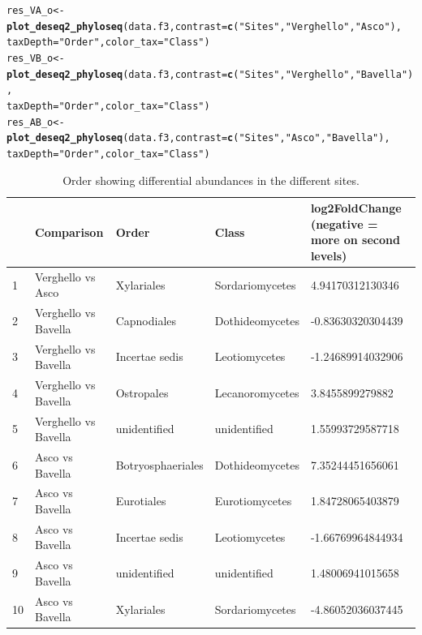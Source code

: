 \documentclass[12pt]{article}\usepackage[]{graphicx}\usepackage[]{color}
\makeatletter
\newcommand{\hlstr}[1]{\textcolor[rgb]{0.192,0.494,0.8}{#1}}%
\newcommand{\hlstd}[1]{\textcolor[rgb]{0.345,0.345,0.345}{#1}}%
\newcommand{\hlkwb}[1]{\textcolor[rgb]{0.69,0.353,0.396}{#1}}%
\newcommand{\hlkwc}[1]{\textcolor[rgb]{0.333,0.667,0.333}{#1}}%
\newcommand{\hlkwd}[1]{\textcolor[rgb]{0.737,0.353,0.396}{\textbf{#1}}}%
\newenvironment{kframe}{%
 \def\at@end@of@kframe{}%
 \ifinner\ifhmode%
  \def\at@end@of@kframe{\end{minipage}}%
  \begin{minipage}{\columnwidth}%
 \fi\fi%
 \def\FrameCommand##1{\hskip\@totalleftmargin \hskip-\fboxsep
 \colorbox{shadecolor}{##1}\hskip-\fboxsep
     \hskip-\linewidth \hskip-\@totalleftmargin \hskip\columnwidth}%
 \MakeFramed {\advance\hsize-\width
   \@totalleftmargin\z@ \linewidth\hsize
   \@setminipage}}%
 {\par\unskip\endMakeFramed%
 \at@end@of@kframe}
\newenvironment{knitrout}{}{} %
\numberwithin{figure}{section}
\makeatother
\begin{document}
\begin{knitrout}\small
{}\color{fgcolor}\begin{kframe}
\begin{alltt}
\hlstd{res_VA_o} \hlkwb{<-} \hlkwd{plot_deseq2_phyloseq}\hlstd{(data.f3,} \hlkwc{contrast} \hlstd{=} \hlkwd{c}\hlstd{(}\hlstr{"Sites"}\hlstd{,} \hlstr{"Verghello"}\hlstd{,} \hlstr{"Asco"}\hlstd{),}
                               \hlkwc{taxDepth} \hlstd{=} \hlstr{"Order"}\hlstd{,} \hlkwc{color_tax} \hlstd{=} \hlstr{"Class"}\hlstd{)}
\hlstd{res_VB_o} \hlkwb{<-} \hlkwd{plot_deseq2_phyloseq}\hlstd{(data.f3,} \hlkwc{contrast} \hlstd{=} \hlkwd{c}\hlstd{(}\hlstr{"Sites"}\hlstd{,} \hlstr{"Verghello"}\hlstd{,} \hlstr{"Bavella"}\hlstd{),}
                               \hlkwc{taxDepth} \hlstd{=} \hlstr{"Order"}\hlstd{,} \hlkwc{color_tax} \hlstd{=} \hlstr{"Class"}\hlstd{)}
\hlstd{res_AB_o} \hlkwb{<-} \hlkwd{plot_deseq2_phyloseq}\hlstd{(data.f3,} \hlkwc{contrast} \hlstd{=} \hlkwd{c}\hlstd{(}\hlstr{"Sites"}\hlstd{,} \hlstr{"Asco"}\hlstd{,} \hlstr{"Bavella"}\hlstd{),}
                               \hlkwc{taxDepth} \hlstd{=} \hlstr{"Order"}\hlstd{,} \hlkwc{color_tax} \hlstd{=} \hlstr{"Class"}\hlstd{)}
\end{alltt}
\end{kframe}
\end{knitrout}

\begin{table}[ht]
\centering
\begingroup\tiny
\begin{tabular}{lllll}
  \hline
 & Comparison & Order & Class & log2FoldChange 
 (negative = more on second levels) \\ 
  \hline
1 & Verghello vs Asco & Xylariales & Sordariomycetes & 4.94170312130346 \\ 
  2 & Verghello vs Bavella & Capnodiales & Dothideomycetes & -0.83630320304439 \\ 
  3 & Verghello vs Bavella & Incertae sedis & Leotiomycetes & -1.24689914032906 \\ 
  4 & Verghello vs Bavella & Ostropales & Lecanoromycetes & 3.8455899279882 \\ 
  5 & Verghello vs Bavella & unidentified & unidentified & 1.55993729587718 \\ 
  6 & Asco vs Bavella & Botryosphaeriales & Dothideomycetes & 7.35244451656061 \\ 
  7 & Asco vs Bavella & Eurotiales & Eurotiomycetes & 1.84728065403879 \\ 
  8 & Asco vs Bavella & Incertae sedis & Leotiomycetes & -1.66769964844934 \\ 
  9 & Asco vs Bavella & unidentified & unidentified & 1.48006941015658 \\ 
  10 & Asco vs Bavella & Xylariales & Sordariomycetes & -4.86052036037445 \\ 
   \hline
\end{tabular}
\endgroup
\caption{Order showing differential abundances in the different sites.} 
\end{table}
\end{document}
